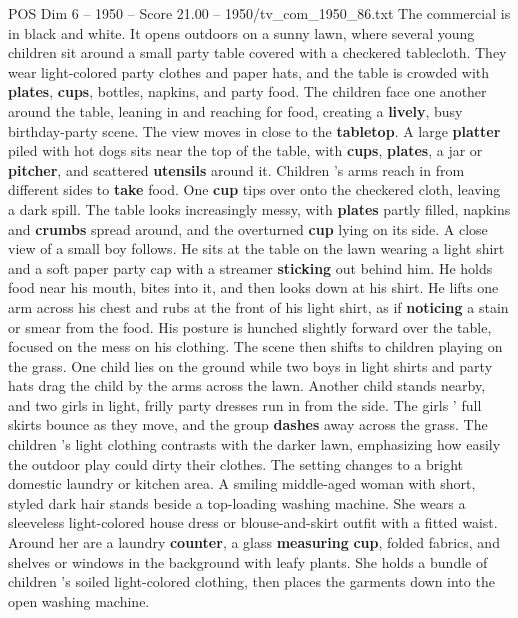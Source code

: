 \begin{textsample}{POS Dim 6 – 1950 – Score 21.00 – 1950/tv\_com\_1950\_86.txt}  \label{ex:f6_pos_001}
The commercial is in black and white.
It opens outdoors on a sunny lawn, where several young children sit around a small party table covered with a checkered tablecloth.
They wear light-colored party clothes and paper hats, and the table is crowded with \textbf{plates}, \textbf{cups}, bottles, napkins, and party food.
The children face one another around the table, leaning in and reaching for food, creating a \textbf{lively}, busy birthday-party scene.
The view moves in close to the \textbf{tabletop}.
A large \textbf{platter} piled with hot dogs sits near the top of the table, with \textbf{cups}, \textbf{plates}, a jar or \textbf{pitcher}, and scattered \textbf{utensils} around it.
Children ’s arms reach in from different sides to \textbf{take} food.
One \textbf{cup} tips over onto the checkered cloth, leaving a dark spill.
The table looks increasingly messy, with \textbf{plates} partly filled, napkins and \textbf{crumbs} spread around, and the overturned \textbf{cup} lying on its side.
A close view of a small boy follows.
He sits at the table on the lawn wearing a light shirt and a soft paper party cap with a streamer \textbf{sticking} out behind him.
He holds food near his mouth, bites into it, and then looks down at his shirt.
He lifts one arm across his chest and rubs at the front of his light shirt, as if \textbf{noticing} a stain or smear from the food.
His posture is hunched slightly forward over the table, focused on the mess on his clothing.
The scene then shifts to children playing on the grass.
One child lies on the ground while two boys in light shirts and party hats drag the child by the arms across the lawn.
Another child stands nearby, and two girls in light, frilly party dresses run in from the side.
The girls ’ full skirts bounce as they move, and the group \textbf{dashes} away across the grass.
The children ’s light clothing contrasts with the darker lawn, emphasizing how easily the outdoor play could dirty their clothes.
The setting changes to a bright domestic laundry or kitchen area.
A smiling middle-aged woman with short, styled dark hair stands beside a top-loading washing machine.
She wears a sleeveless light-colored house dress or blouse-and-skirt outfit with a fitted waist.
Around her are a laundry \textbf{counter}, a glass \textbf{measuring} \textbf{cup}, folded fabrics, and shelves or windows in the background with leafy plants.
She holds a bundle of children ’s soiled light-colored clothing, then places the garments down into the open washing machine.

\end{textsample}
